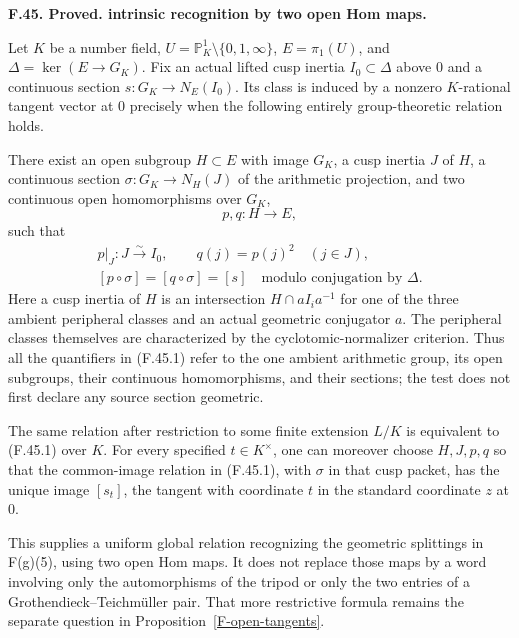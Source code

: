 \documentclass[11pt,oneside]{article}
\makeatletter
\newcounter{statementanchor}
\newenvironment{statement}[3]{%
 \refstepcounter{statementanchor}\def\@currentlabel{#1}%
 \par\addvspace{9pt}\noindent
 \textbf{#1. #2. #3.}\par\nobreak\noindent\ignorespaces
}{\par\addvspace{5pt}}
\makeatother
\begin{document}
\begin{statement}{F.45}{Proved}{intrinsic recognition by two open Hom maps}
\label{st:F.45}
\label{F-two-Hom-tangents}
Let $K$ be a number field, $U=\mathbb P^1_K\setminus\{0,1,\infty\}$,
$E=\pi_1(U)$, and $\Delta=\ker(E\to G_K)$. Fix an actual lifted
cusp inertia $I_0\subset\Delta$ above $0$ and a continuous section
$s:G_K\to N_E(I_0)$. Its class is induced by a nonzero
$K$-rational tangent vector at $0$ precisely when the following
entirely group-theoretic relation holds.

There exist an open subgroup $H\subset E$ with image $G_K$, a cusp
inertia $J$ of $H$, a continuous section
$\sigma:G_K\to N_H(J)$ of the arithmetic projection, and two
continuous open homomorphisms over $G_K$,
\[
                       p,q:H\longrightarrow E,
\]
such that
\[
 \begin{gathered}
 p|_J:J\xrightarrow{\sim} I_0,\qquad
 q(j)=p(j)^2\quad(j\in J),\\
             [p\circ\sigma]=[q\circ\sigma]=[s]
       \quad\text{modulo conjugation by }\Delta.
 \tag{F.45.1}
 \end{gathered}
\]
Here a cusp inertia of $H$ is an intersection
$H\cap aI_i a^{-1}$ for one of the three ambient peripheral
classes and an actual geometric conjugator $a$. The peripheral
classes themselves are characterized by the cyclotomic-normalizer
criterion. Thus all the quantifiers in (F.45.1) refer to the one
ambient arithmetic group, its open subgroups, their continuous
homomorphisms, and their sections; the test does not first declare
any source section geometric.

The same relation after restriction to some finite extension
$L/K$ is equivalent to (F.45.1) over $K$. For every specified
$t\in K^\times$, one can moreover choose $H,J,p,q$ so that the
common-image relation in (F.45.1), with $\sigma$ in that cusp
packet, has the unique image $[s_t]$, the tangent with coordinate
$t$ in the standard coordinate $z$ at $0$.

This supplies a uniform global relation recognizing the geometric
splittings in F(g)(5), using two open Hom maps. It does not replace
those maps by a word involving only the automorphisms of the
tripod or only the two entries of a Grothendieck--Teichm\"uller
pair. That more restrictive formula remains the separate question
in Proposition~\ref{F-open-tangents}.
\end{statement}
\end{document}
